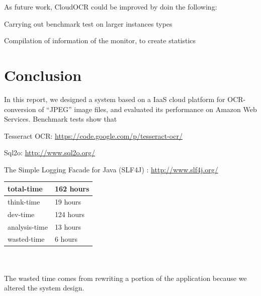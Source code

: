 \documentclass[a4paper]{IEEEtran}
\begin{document}
	As future work, CloudOCR could be improved by doin the following:
	\begin{LaTeXdescription}
		\item Carrying out benchmark test on larger instances types
		\item Compilation of information of the monitor, to create statistics
		\item 
	\end{LaTeXdescription}
\section{Conclusion}
In this report, we designed a system based on a IaaS cloud platform for OCR-conversion of ``JPEG'' image files, and evaluated its performance on Amazon Web Services.
Benchmark tests show that

\begin{thebibliography}{9}

 

 {
	Tesseract OCR: \url{https://code.google.com/p/tesseract-ocr/}
}

 {
	Sql2o: \url{http://www.sql2o.org/}
}

 {
	The Simple Logging Facade for Java (SLF4J) : \url{http://www.slf4j.org/}
}

\end{thebibliography}


\begin{tabular}{| l | l |}
\hline
total-time & 162 hours \\ \hline
think-time & 19 hours \\ \hline
dev-time & 124 hours \\ \hline
analysis-time & 13 hours \\ \hline
wasted-time & 6 hours \\ \hline
\end{tabular}
\\\ 
\\
The wasted time comes from rewriting a portion of the application because we altered the system design.
\end{document}
